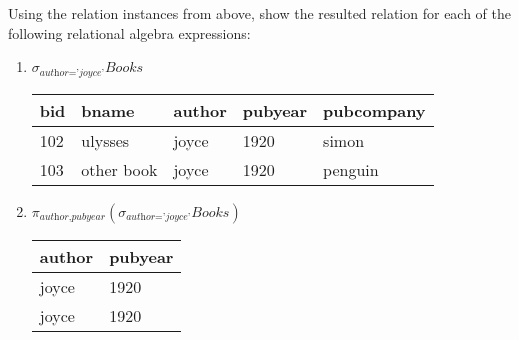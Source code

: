 \documentclass[letterpaper, 11pt]{article}
\begin{document}
Using the relation instances from above, show the resulted relation for each of the following relational algebra expressions:
\begin{enumerate}[label={\alph*}),leftmargin=*]
    \item $\sigma_{\textit{author='joyce'}}\textit{Books}$
    \begin{table}[H]
        \centering
        \begin{tabular}{|l|l|l|l|l|}
        \hline
            \cellcolor[HTML]{b4c6e7} bid & \cellcolor[HTML]{b4c6e7} bname & \cellcolor[HTML]{b4c6e7} author & \cellcolor[HTML]{b4c6e7} pubyear & \cellcolor[HTML]{b4c6e7} pubcompany \\
            \hline
            102 & ulysses & joyce & 1920 & simon \\
            \hline
            103 & other book & joyce & 1920 & penguin \\
            \hline
        \end{tabular}
    \end{table}
    
    \item $\pi_{\textit{author,pubyear}}(\sigma_{\textit{author='joyce'}}\textit{Books})$
    \begin{table}[H]
        \centering
        \begin{tabular}{|l|l|}
        \hline
            \cellcolor[HTML]{b4c6e7} author & \cellcolor[HTML]{b4c6e7} pubyear \\
            \hline
            joyce & 1920 \\
            \hline
            joyce & 1920 \\
            \hline
        \end{tabular}
    \end{table}
    

\end{enumerate}
\end{document}
